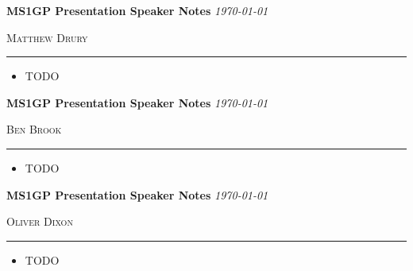 \documentclass[12pt]{article}
\newcommand{\printheading}[1]{%
        \clearpage
        \large \textbf{MS1GP Presentation Speaker Notes}
        \hfill \textit{\today}

        \vspace{.5em}
        \textsc{#1} \normalsize

        \vspace{1em}
        \hrule
        \vspace{2em}
}
\begin{document}
\printheading{Matthew Drury}
\begin{itemize}
        \item TODO
\end{itemize}

\printheading{Ben Brook}
\begin{itemize}
        \item TODO
\end{itemize}

\printheading{Oliver Dixon}
\begin{itemize}
        \item TODO
\end{itemize}
\end{document}
